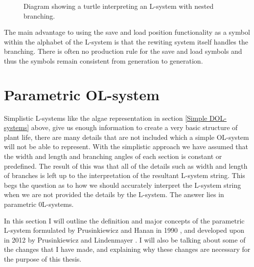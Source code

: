 \begin{flushleft}
\begin{figure}[htbp]
	{\centering
		\setlength{\fboxrule}{1pt}
		\vspace{7px}
		\caption{Diagram showing a turtle interpreting an L-system with nested branching.} \label{branching 2}
	}
\end{figure}
\FloatBarrier

The main advantage to using the save and load position functionality as a symbol within the alphabet of the L-system is that the rewiting system itself handles the branching. There is often no production rule for the save and load symbols and thus the symbols remain consistent from generation to generation. \\ 

\end{flushleft}

\section{Parametric OL-system} \label{parametric}

\begin{flushleft}

Simplistic L-systems like the algae representation in section \ref{Simple DOL-systems} above, give us enough information to create a very basic structure of plant life, there are many details that are not included which a simple OL-system will not be able to represent. With the simplistic approach we have assumed that the width and length and branching angles of each section is constant or predefined. The result of this was that all of the details such as width and length of branches is left up to the interpretation of the resultant L-system string. This begs the question as to how we should accurately interpret the L-system string when we are not provided the details by the L-system. The answer lies in parametric 0L-systems.

\vspace{5mm}

In this section I will outline the definition and major concepts of the parametric L-system formulated by Prusinkiewicz and Hanan in 1990 \cite{prusinkiewicz1990visualization}, and developed upon in 2012 by Prusinkiewicz and Lindenmayer \cite{prusinkiewicz2012algorithmic}. I will also be talking about some of the changes that I have made, and explaining why these changes are necessary for the purpose of this thesis.

\end{flushleft}

